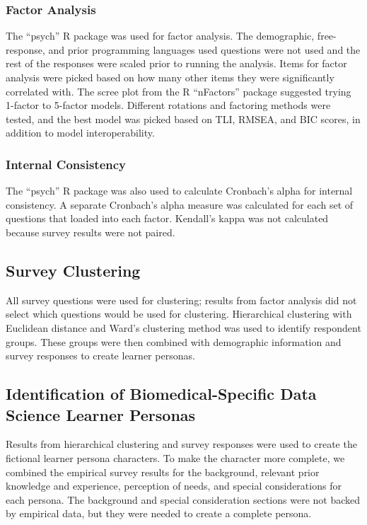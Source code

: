\documentclass[020-persona\_validation.tex]{subfiles}
\begin{document}
    \subsubsection{Factor Analysis}

        The ``psych'' R package was used for factor analysis.
        The demographic, free-response, and prior programming languages used questions
        were not used and the rest of the responses were scaled prior to running the analysis.
        Items for factor analysis were picked based on how many other items they were significantly correlated with.
        The scree plot from the R ``nFactors'' package suggested trying 1-factor to 5-factor models.
        Different rotations and factoring methods were tested,
        and the best model was picked based on
        TLI, RMSEA, and BIC scores, in addition to model interoperability.


    \subsubsection{Internal Consistency}

        The ``psych'' R package was also used to calculate Cronbach's alpha for internal consistency.
        A separate Cronbach's alpha measure was calculated for each set of questions that loaded into each factor.
        Kendall's kappa was not calculated because survey results were not paired.

    \subsection{Survey Clustering}

        All survey questions were used for clustering;
        results from factor analysis did not select which questions would be used for clustering.
        Hierarchical clustering with Euclidean distance and
        Ward's clustering method was used to identify respondent groups.
        These groups were then combined with demographic information and survey responses to create learner personas.

    \subsection{Identification of Biomedical-Specific Data Science Learner Personas}

        Results from hierarchical clustering and survey responses were used to create the
        fictional learner persona characters.
        To make the character more complete,
        we combined the empirical survey results for the
        background,
        relevant prior knowledge and experience,
        perception of needs,
        and special considerations
        for each persona.
        The background and special consideration sections were not backed by empirical data,
        but they were needed to create a complete persona.
\end{document}
